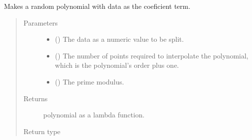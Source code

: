\documentclass[letterpaper,10pt,english]{sphinxmanual}
\begin{document}
\begin{fulllineitems}
\label{\detokenize{index:Toolkit.generate_polynomial}}
Makes a random polynomial with data as the coeficient term.
\begin{quote}\begin{description}
\item[{Parameters}] \leavevmode\begin{itemize}
\item {} 
 () \textendash{} The data as a numeric value to be split.

\item {} 
 () \textendash{} The number of points required to interpolate the polynomial,
which is the polynomial’s order plus one.

\item {} 
 () \textendash{} The prime modulus.

\end{itemize}

\item[{Returns}] \leavevmode
polynomial as a lambda function.

\item[{Return type}] \leavevmode
{\hyperref[\detokenize{index:Toolkit.Polynomial}]{}}

\end{description}\end{quote}

\end{fulllineitems}

\end{document}
